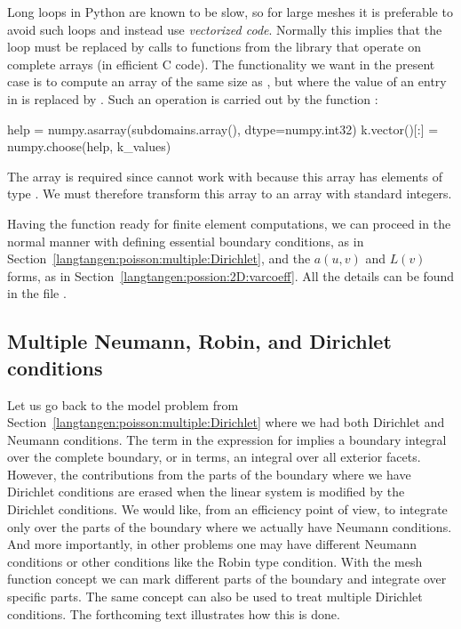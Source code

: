 Long loops in Python are known to be slow, so for large meshes it is
preferable to avoid such loops and instead use \emph{vectorized code}.
Normally this implies that the loop must be replaced by calls to
functions from the  library that operate on complete arrays
(in efficient C code). The functionality we want in the present case
is to compute an array of the same size as ,
but where the value  of an entry in 
is replaced by .  Such an operation is carried out by
the  function :
\begin{python}
help = numpy.asarray(subdomains.array(), dtype=numpy.int32)
k.vector()[:] = numpy.choose(help, k_values)
\end{python}
The  array is required since  cannot work with
 because this array has elements of type
. We must therefore transform this array to an array
 with standard  integers.

Having the  function ready for finite element
computations, we can proceed in the normal manner
with defining essential boundary conditions, as in
Section~\ref{langtangen:poisson:multiple:Dirichlet}, and the $a(u,v)$
and $L(v)$ forms, as in Section~\ref{langtangen:possion:2D:varcoeff}.
All the details can be found in the file .

\subsection{Multiple Neumann, Robin, and Dirichlet conditions}
\label{langtangen:poisson:mat:neumann}

Let us go back to the model problem from
Section~\ref{langtangen:poisson:multiple:Dirichlet} where we had both
Dirichlet and Neumann conditions.  The term  in the expression
for  implies a boundary integral over the complete boundary,
or in \fenics{} terms, an integral over all exterior facets.
However, the contributions from the parts of the boundary where we have
Dirichlet conditions are erased when the linear system is modified by the
Dirichlet conditions.  We would like, from an efficiency point of view,
to integrate  only over the parts of the boundary where
we actually have Neumann conditions.  And more importantly, in other
problems one may have different Neumann conditions or other conditions
like the Robin type condition.  With the mesh function concept we can
mark different parts of the boundary and integrate over specific parts.
The same concept can also be used to treat multiple Dirichlet conditions.
The forthcoming text illustrates how this is done.

